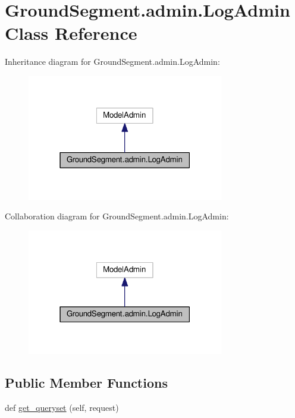 \hypertarget{class_ground_segment_1_1admin_1_1_log_admin}{}\section{Ground\+Segment.\+admin.\+Log\+Admin Class Reference}
\label{class_ground_segment_1_1admin_1_1_log_admin}


Inheritance diagram for Ground\+Segment.\+admin.\+Log\+Admin\+:\nopagebreak
\begin{figure}[H]
\begin{center}
\leavevmode
\includegraphics[width=243pt]{class_ground_segment_1_1admin_1_1_log_admin__inherit__graph}
\end{center}
\end{figure}


Collaboration diagram for Ground\+Segment.\+admin.\+Log\+Admin\+:\nopagebreak
\begin{figure}[H]
\begin{center}
\leavevmode
\includegraphics[width=243pt]{class_ground_segment_1_1admin_1_1_log_admin__coll__graph}
\end{center}
\end{figure}
\subsection*{Public Member Functions}
\begin{DoxyCompactItemize}
\item 
def \hyperlink{class_ground_segment_1_1admin_1_1_log_admin_ab972229da908405f30511b5faecd9c60}{get\+\_\+queryset} (self, request)
\end{DoxyCompactItemize}
